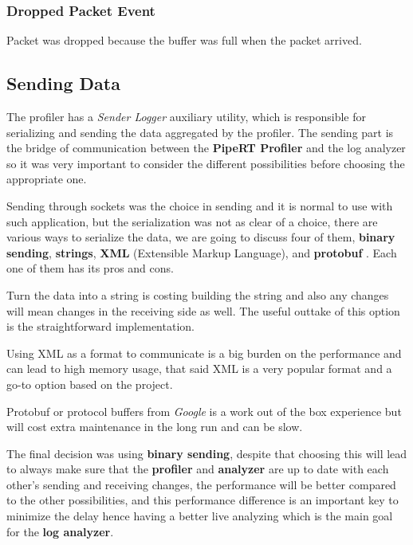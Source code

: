 \subsubsection{Dropped Packet Event}
Packet was dropped because the buffer was full when the packet arrived.

\subsection{Sending Data} \label{sec:sending_data}
The profiler has a \textit{Sender Logger} auxiliary utility, which is responsible for serializing and sending
the data aggregated by the profiler. The sending part is the bridge of communication between the \textbf{PipeRT Profiler}
and the log analyzer so it was very important to consider the different possibilities before choosing the appropriate one.

Sending through sockets was the choice in sending and it is normal to use with such application, but the serialization
was not as clear of a choice, there are various ways to serialize the data, we are going to discuss four of them,
\textbf{binary sending}, \textbf{strings}, \textbf{XML} (Extensible Markup Language), and \textbf{protobuf} \cite{protobuf}.
Each one of them has its pros and cons.

Turn the data into a string is costing building the string and also any changes will mean changes in the
receiving side as well. The useful outtake of this option is the straightforward implementation.

Using XML as a format to communicate is a big burden on the performance and can lead to high memory usage,
that said XML is a very popular format and a go-to option based on the project.

Protobuf or protocol buffers from \textit{Google} is a work out of the box experience but will cost
extra maintenance in the long run and can be slow.

The final decision was using \textbf{binary sending}, despite that choosing this will lead to always make
sure that the \textbf{profiler} and \textbf{analyzer} are up to date with each other's sending and receiving
changes, the performance will be better compared to the other possibilities, and this performance
difference is an important key to minimize the delay hence having a better live analyzing which is the
main goal for the \textbf{log analyzer}.


